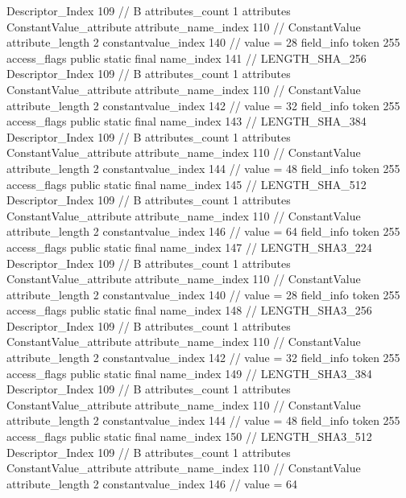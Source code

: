 {{{{{				Descriptor_Index	109		// B
				attributes_count	1
				attributes {
				ConstantValue_attribute {
					attribute_name_index	110		// ConstantValue
					attribute_length	2
					constantvalue_index	140		// value = 28
				}
				}
			}
			field_info {
				token	255
				access_flags	public static final
				name_index	141		// LENGTH_SHA_256
				Descriptor_Index	109		// B
				attributes_count	1
				attributes {
				ConstantValue_attribute {
					attribute_name_index	110		// ConstantValue
					attribute_length	2
					constantvalue_index	142		// value = 32
				}
				}
			}
			field_info {
				token	255
				access_flags	public static final
				name_index	143		// LENGTH_SHA_384
				Descriptor_Index	109		// B
				attributes_count	1
				attributes {
				ConstantValue_attribute {
					attribute_name_index	110		// ConstantValue
					attribute_length	2
					constantvalue_index	144		// value = 48
				}
				}
			}
			field_info {
				token	255
				access_flags	public static final
				name_index	145		// LENGTH_SHA_512
				Descriptor_Index	109		// B
				attributes_count	1
				attributes {
				ConstantValue_attribute {
					attribute_name_index	110		// ConstantValue
					attribute_length	2
					constantvalue_index	146		// value = 64
				}
				}
			}
			field_info {
				token	255
				access_flags	public static final
				name_index	147		// LENGTH_SHA3_224
				Descriptor_Index	109		// B
				attributes_count	1
				attributes {
				ConstantValue_attribute {
					attribute_name_index	110		// ConstantValue
					attribute_length	2
					constantvalue_index	140		// value = 28
				}
				}
			}
			field_info {
				token	255
				access_flags	public static final
				name_index	148		// LENGTH_SHA3_256
				Descriptor_Index	109		// B
				attributes_count	1
				attributes {
				ConstantValue_attribute {
					attribute_name_index	110		// ConstantValue
					attribute_length	2
					constantvalue_index	142		// value = 32
				}
				}
			}
			field_info {
				token	255
				access_flags	public static final
				name_index	149		// LENGTH_SHA3_384
				Descriptor_Index	109		// B
				attributes_count	1
				attributes {
				ConstantValue_attribute {
					attribute_name_index	110		// ConstantValue
					attribute_length	2
					constantvalue_index	144		// value = 48
				}
				}
			}
			field_info {
				token	255
				access_flags	public static final
				name_index	150		// LENGTH_SHA3_512
				Descriptor_Index	109		// B
				attributes_count	1
				attributes {
				ConstantValue_attribute {
					attribute_name_index	110		// ConstantValue
					attribute_length	2
					constantvalue_index	146		// value = 64
				}
}}}}}}
